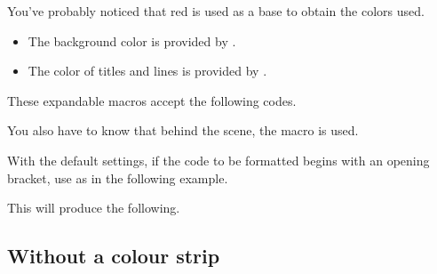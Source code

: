 \begin{tdocnote}
    You've probably noticed that red is used as a base to obtain the colors used.

    \begin{itemize}
    	\item The background color is provided by .

    	\item The color of titles and lines is provided by .
    \end{itemize}

    These expandable macros accept the following codes.

    \begin{tdoclatex}[code]

    \end{tdoclatex}

    You also have to know that behind the scene, the  macro is used.

    \begin{tdoclatex}[std]
    \end{tdoclatex}
\end{tdocnote}




\begin{tdocwarn}
    With the default settings, if the code to be formatted begins with an opening bracket, use  as in the following example.



    This will produce the following.
\end{tdocwarn}






\subsection{Without a colour strip}

